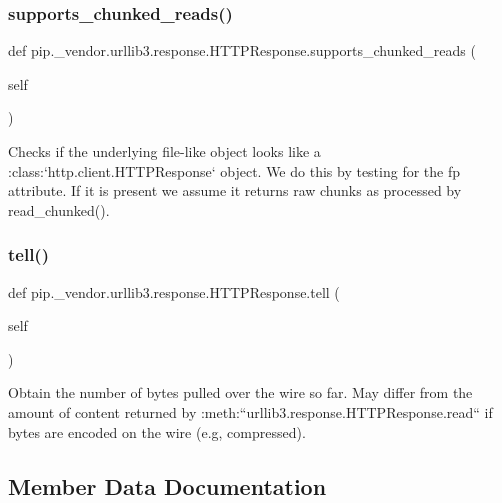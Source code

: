\subsubsection{\texorpdfstring{supports\+\_\+chunked\+\_\+reads()}{supports\_chunked\_reads()}}
{\footnotesize\ttfamily def pip.\+\_\+vendor.\+urllib3.\+response.\+H\+T\+T\+P\+Response.\+supports\+\_\+chunked\+\_\+reads (\begin{DoxyParamCaption}\item[{}]{self }\end{DoxyParamCaption})}

\begin{DoxyVerb}Checks if the underlying file-like object looks like a
:class:`http.client.HTTPResponse` object. We do this by testing for
the fp attribute. If it is present we assume it returns raw chunks as
processed by read_chunked().
\end{DoxyVerb}
 \mbox{\label{classpip_1_1__vendor_1_1urllib3_1_1response_1_1HTTPResponse_aad1e9c42472d7ccf472e09e54b268bc4}} 
\subsubsection{\texorpdfstring{tell()}{tell()}}
{\footnotesize\ttfamily def pip.\+\_\+vendor.\+urllib3.\+response.\+H\+T\+T\+P\+Response.\+tell (\begin{DoxyParamCaption}\item[{}]{self }\end{DoxyParamCaption})}

\begin{DoxyVerb}Obtain the number of bytes pulled over the wire so far. May differ from
the amount of content returned by :meth:``urllib3.response.HTTPResponse.read``
if bytes are encoded on the wire (e.g, compressed).
\end{DoxyVerb}
 

\subsection{Member Data Documentation}
\mbox{\label{classpip_1_1__vendor_1_1urllib3_1_1response_1_1HTTPResponse_a6d44c2eca87a45b0d06ffc4461ac053f}} 
